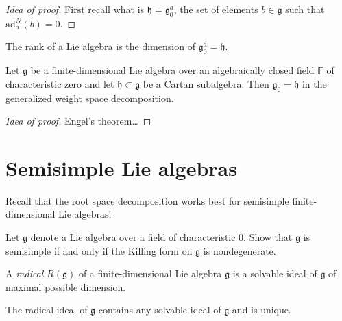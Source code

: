 \begin{proof}[Idea of proof]
First recall what is $\mathfrak{h}=\mathfrak{g}_0^a$, the set of elements
$b\in\mathfrak{g}$ such that $\text{ad}_a^N(b)=0$.
\end{proof}

\begin{remark}
\label{remark-rank-is-dimension-of-that-subalgebra}
The rank of a Lie algebra is the dimension of $\mathfrak{g}_0^a=\mathfrak{h}$.
\end{remark}

\begin{proposition}
\label{proposition-g0-equals-h-for-any-Cartan-subalgebra-h}
Let $\mathfrak{g}$ be a finite-dimensional Lie algebra over
an algebraically closed field $\mathbb{F}$ of characteristic zero
and let $\mathfrak{h}\subset\mathfrak{g}$ be a Cartan subalgebra.
Then $\mathfrak{g}_0=\mathfrak{h}$ in the generalized 
weight space decomposition.
\end{proposition}

\begin{proof}[Idea of proof]
Engel's theorem…
\end{proof}



\section{Semisimple Lie algebras}
\label{section-semisimple-Lie-algebras}

\noindent
Recall that the root space decomposition
works best for semisimple finite-dimensional Lie algebras!

\begin{exercise}
\label{exercise-semisimple-iff-killing-nondegenerate}
\begin{reference}
\cite[Exercise 12.1]{KLAL}
\end{reference}
Let $\mathfrak{g}$ denote a Lie algebra over a field of characteristic 0.
Show that $\mathfrak{g}$ is semisimple if and only if
the Killing form on $\mathfrak{g}$ is nondegenerate.
\end{exercise}

\begin{definition}
\label{definition-radical}
A {\it radical} $R(\mathfrak{g})$ of a finite-dimensional Lie algebra
$\mathfrak{g}$ is a solvable ideal of $\mathfrak{g}$ of maximal possible
dimension.
\end{definition}

\begin{proposition}
\label{proposition-radical-ideal-contains-any-solvable-ideal-and-is-unique}
The radical ideal of $\mathfrak{g}$ contains any solvable ideal of
$\mathfrak{g}$ and is unique.
\end{proposition}

